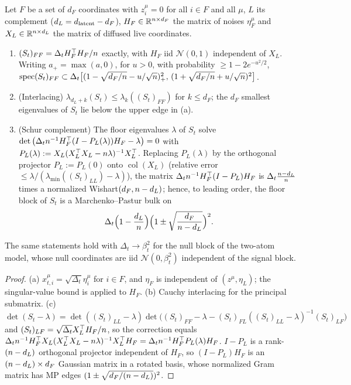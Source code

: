 \begin{lemma}\label{lem:sampling-real}
Let $F$ be a set of $d_F$ coordinates with $z^\mu_i=0$ for all $i\in F$ and all $\mu$, $L$ its complement ($d_L=d_{\mathrm{latent}}-d_F$), $H_F\in\mathbb{R}^{n\times d_F}$ the matrix of noises $\eta^\mu_F$ and $X_L\in\mathbb{R}^{n\times d_L}$ the matrix of diffused live coordinates.
\begin{enumerate}
\item[(a)] $(S_t)_{FF}=\Delta_tH_F^\top H_F/n$ exactly, with $H_F$ iid $\mathcal N(0,1)$ independent of $X_L$. Writing $a_+=\max(a,0)$, for $u>0$, with probability $\ge1-2e^{-u^2/2}$,
$\operatorname{spec}(S_t)_{FF}\subset\Delta_t\big[(1-\sqrt{d_F/n}-u/\sqrt{n})_+^2,\,(1+\sqrt{d_F/n}+u/\sqrt{n})^2\big]$.
\item[(b)] (Interlacing) $\lambda_{d_L+k}(S_t)\le\lambda_k((S_t)_{FF})$ for $k\le d_F$; the $d_F$ smallest eigenvalues of $S_t$ lie below the upper edge in (a).
\item[(c)] (Schur complement) The floor eigenvalues $\lambda$ of $S_t$ solve $\det\big(\Delta_tn^{-1}H_F^\top(I-P_L(\lambda))H_F-\lambda\big)=0$ with $P_L(\lambda):=X_L(X_L^\top X_L-n\lambda)^{-1}X_L^\top$. Replacing $P_L(\lambda)$ by the orthogonal projector $P_L:=P_L(0)$ onto $\operatorname{col}(X_L)$ (relative error $\le\lambda/(\lambda_{\min}((S_t)_{LL})-\lambda)$), the matrix $\Delta_tn^{-1}H_F^\top(I-P_L)H_F$ is $\Delta_t\frac{n-d_L}{n}$ times a normalized Wishart$(d_F,n-d_L)$; hence, to leading order, the floor block of $S_t$ is a Marchenko--Pastur bulk on
\begin{equation}\label{eq:mp-floor-real}
\Delta_t\Big(1-\frac{d_L}{n}\Big)\Big(1\pm\sqrt{\frac{d_F}{n-d_L}}\Big)^2 .
\end{equation}
\end{enumerate}
The same statements hold with $\Delta_t\to\beta_t^2$ for the null block of the two-atom model, whose null coordinates are iid $\mathcal N(0,\beta_t^2)$ independent of the signal block.
\end{lemma}
\begin{proof}
(a) $x^\mu_{t,i}=\sqrt{\Delta_t}\eta^\mu_i$ for $i\in F$, and $\eta_F$ is independent of $(z^\mu,\eta_L)$; the singular-value bound is \citet[Cor.~5.35]{vershynin2010introduction} applied to $H_F$. (b) Cauchy interlacing for the principal submatrix. (c) $\det(S_t-\lambda)=\det((S_t)_{LL}-\lambda)\det\big((S_t)_{FF}-\lambda-(S_t)_{FL}((S_t)_{LL}-\lambda)^{-1}(S_t)_{LF}\big)$ and $(S_t)_{LF}=\sqrt{\Delta_t}X_L^\top H_F/n$, so the correction equals $\Delta_tn^{-1}H_F^\top X_L(X_L^\top X_L-n\lambda)^{-1}X_L^\top H_F=\Delta_tn^{-1}H_F^\top P_L(\lambda)H_F$. $I-P_L$ is a rank-$(n-d_L)$ orthogonal projector independent of $H_F$, so $(I-P_L)H_F$ is an $(n-d_L)\times d_F$ Gaussian matrix in a rotated basis, whose normalized Gram matrix has MP edges $(1\pm\sqrt{d_F/(n-d_L)})^2$.
\end{proof}
